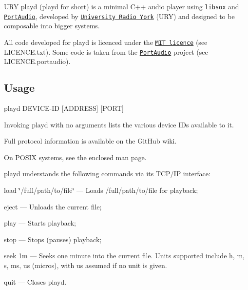 U\+R\+Y playd ({\ttfamily playd} for short) is a minimal C++ audio player using \href{http://sox.sourceforge.net/}{\tt libsox} and \href{http://www.portaudio.com/}{\tt Port\+Audio}, developed by \href{http://ury.org.uk}{\tt University Radio York} (U\+R\+Y) and designed to be composable into bigger systems.

All code developed for {\ttfamily playd} is licenced under the \href{http://opensource.org/licenses/MIT}{\tt M\+I\+T licence} (see L\+I\+C\+E\+N\+C\+E.\+txt). Some code is taken from the \href{http://www.portaudio.com/}{\tt Port\+Audio} project (see L\+I\+C\+E\+N\+C\+E.\+portaudio).

\subsection*{Usage}

{\ttfamily playd D\+E\+V\+I\+C\+E-\/\+I\+D \mbox{[}A\+D\+D\+R\+E\+S\+S\mbox{]} \mbox{[}P\+O\+R\+T\mbox{]}}


\begin{DoxyItemize}
\item Invoking {\ttfamily playd} with no arguments lists the various device I\+Ds available to it.
\item Full protocol information is available on the Git\+Hub wiki.
\item On P\+O\+S\+I\+X systems, see the enclosed man page.
\end{DoxyItemize}

{\ttfamily playd} understands the following commands via its T\+C\+P/\+I\+P interface\+:


\begin{DoxyItemize}
\item {\ttfamily load \char`\"{}/full/path/to/file\char`\"{}} — Loads /full/path/to/file for playback;
\item {\ttfamily eject} — Unloads the current file;
\item {\ttfamily play} — Starts playback;
\item {\ttfamily stop} — Stops (pauses) playback;
\item {\ttfamily seek 1m} — Seeks one minute into the current file. Units supported include {\ttfamily h}, {\ttfamily m}, {\ttfamily s}, {\ttfamily ms}, {\ttfamily us} (micros), with {\ttfamily us} assumed if no unit is given.
\item {\ttfamily quit} — Closes {\ttfamily playd}.
\end{DoxyItemize}


